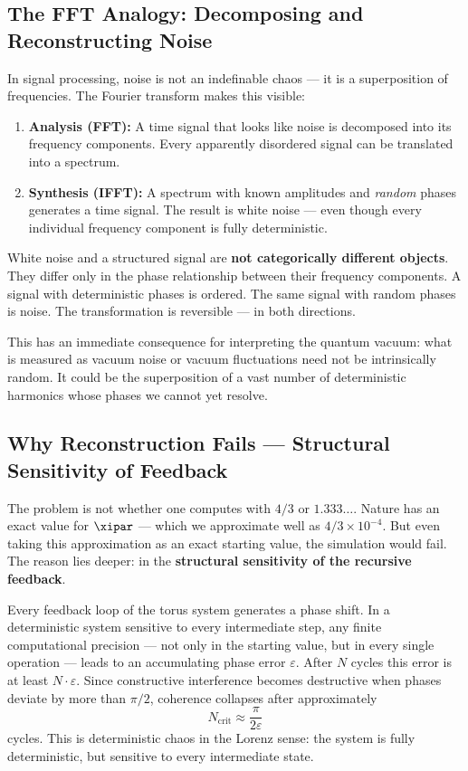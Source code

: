 \subsection{The FFT Analogy: Decomposing and Reconstructing Noise}

In signal processing, noise is not an indefinable chaos — it is a superposition of
frequencies. The Fourier transform makes this visible:

\begin{enumerate}
    \item \textbf{Analysis (FFT):} A time signal that looks like noise is decomposed
    into its frequency components. Every apparently disordered signal can be
    translated into a spectrum.
    \item \textbf{Synthesis (IFFT):} A spectrum with known amplitudes and
    \emph{random} phases generates a time signal. The result is white noise —
    even though every individual frequency component is fully deterministic.
\end{enumerate}

\begin{keypoint}
White noise and a structured signal are \textbf{not categorically different objects}.
They differ only in the phase relationship between their frequency components.
A signal with deterministic phases is ordered. The same signal with random phases
is noise. The transformation is reversible — in both directions.
\end{keypoint}

This has an immediate consequence for interpreting the quantum vacuum: what is
measured as vacuum noise or vacuum fluctuations need not be intrinsically random.
It could be the superposition of a vast number of deterministic harmonics whose
phases we cannot yet resolve.


\subsection{Why Reconstruction Fails — Structural Sensitivity of Feedback}

The problem is not whether one computes with $4/3$ or $1.333\ldots$.
Nature has an exact value for $\xipar$ — which we approximate well as
$4/3 \times 10^{-4}$. But even taking this approximation as an exact starting
value, the simulation would fail. The reason lies deeper: in the \textbf{structural
sensitivity of the recursive feedback}.

Every feedback loop of the torus system generates a phase shift. In a deterministic
system sensitive to every intermediate step, any finite computational precision —
not only in the starting value, but in every single operation — leads to an
accumulating phase error $\varepsilon$. After $N$ cycles this error is at least
$N \cdot \varepsilon$. Since constructive interference becomes destructive when
phases deviate by more than $\pi/2$, coherence collapses after approximately
\begin{equation}
    N_\text{crit} \approx \frac{\pi}{2\varepsilon}
\end{equation}
cycles. This is deterministic chaos in the Lorenz sense: the system is fully
deterministic, but sensitive to every intermediate state.

